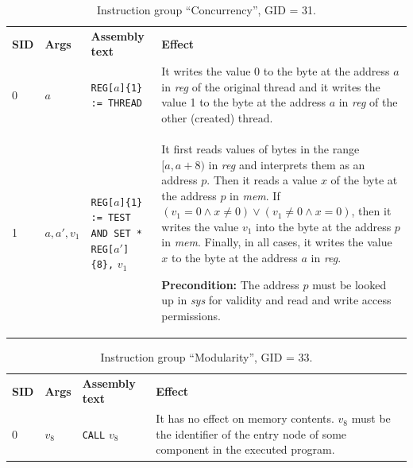\documentclass[10pt,twocolumn]{article}
\begin{document}
\begin{table}[!h]
\begin{center}
\def\arraystretch{1.5}
\begin{tabular}{lp{1.2cm}p{5.5cm}p{7.5cm}}
\textbf{SID} & \textbf{Args} & \textbf{Assembly text} & \textbf{Effect}
\\

0 & $ a $ %
& \texttt{REG[}$ a $\texttt{]\{1\} := THREAD} %
& It writes the value 0 to the byte at the address $ a $ in \textit{reg} of the
original thread and it writes the value 1 to the byte at the address $ a $ in
\textit{reg} of the other (created) thread. \\

1 & $ a,a', v_1 $ %
& \texttt{REG[}$ a $\texttt{]\{1\} := TEST AND SET * REG[}$ a'
$\texttt{]\{8\},} $ v_1 $ %
& It first reads values of bytes in the range $ [a,a+8) $ in \textit{reg} and
interprets them as an address $ p $. Then it reads a value $ x $ of the byte at
the address $ p $ in \textit{mem}. If $ (v_1 = 0 \wedge x \not= 0) \vee (v_1
\not= 0 \wedge x = 0) $, then it writes the value $ v_1 $ into the byte at the
address $ p $ in \textit{mem}. Finally, in all cases, it writes the value $ x $
to the byte at the address $ a $ in \textit{reg}.

\textbf{Precondition:} The address $ p $ must be looked up in \textit{sys} for
validity and read and write access permissions. \\

\end{tabular}
\end{center}
\caption{Instruction group ``Concurrency'', GID = 31.}
\label{tab:igroup:concurrency}
\end{table}




\begin{table}[!h]
\begin{center}
\def\arraystretch{1.5}
\begin{tabular}{lp{1.2cm}p{5.5cm}p{7.5cm}}
\textbf{SID} & \textbf{Args} & \textbf{Assembly text} & \textbf{Effect}
\\

0 & $ v_8 $ %
& \texttt{CALL} $ v_8 $ %
& It has no effect on memory contents. $ v_8 $ must be the identifier of the
entry node of some component in the executed program. \\

\end{tabular}
\end{center}
\caption{Instruction group ``Modularity'', GID = 33.}
\label{tab:igroup:modularity}
\end{table}
\end{document}

